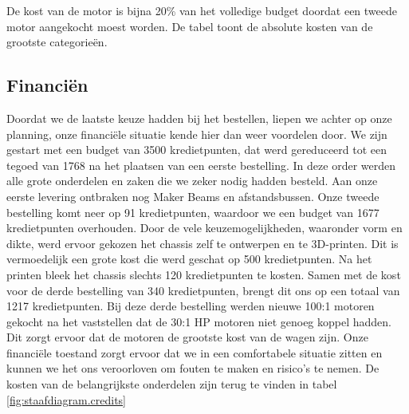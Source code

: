 \documentclass[a4paper,kulak]{kulakarticle}
\begin{document}
\begin{table}[h]
	
	\caption{De kost van de motor is bijna 20\% van het volledige budget doordat een tweede motor aangekocht moest worden. De tabel toont de absolute kosten van de grootste categorieën.}\label{fig:staafdiagram.credits}
\end{table}
\subsection{Financiën}

Doordat we de laatste keuze hadden bij het bestellen, liepen we achter op onze planning, onze financiële situatie kende hier dan weer voordelen door. We zijn gestart met een budget van 3500 kredietpunten, dat werd gereduceerd tot een tegoed van 1768 na het plaatsen van een eerste bestelling. In deze  order werden alle grote onderdelen en zaken die we zeker nodig hadden besteld.  Aan onze eerste levering ontbraken nog Maker Beams en afstandsbussen. Onze tweede bestelling komt neer op 91 kredietpunten, waardoor we een budget van 1677 kredietpunten overhouden. Door de vele keuzemogelijkheden, waaronder vorm en dikte, werd ervoor gekozen het chassis zelf te ontwerpen en te 3D-printen. Dit is vermoedelijk een grote kost die werd geschat op 500 kredietpunten. Na het printen bleek het chassis slechts 120 kredietpunten te kosten. Samen met de kost voor de derde bestelling van 340 kredietpunten, brengt dit ons op een totaal van 1217 kredietpunten. Bij deze derde bestelling werden nieuwe 100:1 motoren gekocht na het vaststellen dat de 30:1 HP motoren niet genoeg koppel hadden. Dit zorgt ervoor dat de motoren de grootste kost van de wagen zijn. Onze financiële toestand zorgt ervoor dat we in een comfortabele situatie zitten en kunnen we het ons veroorloven om fouten te maken en risico's te nemen. De kosten van de belangrijkste onderdelen zijn terug te vinden in tabel \ref{fig:staafdiagram.credits}
\end{document}
